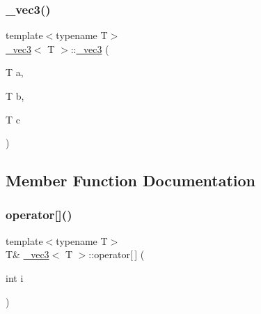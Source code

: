 \mbox{\label{class__vec3_ae790417c9b3713558524c2136951bcaa}} 
\subsubsection{\texorpdfstring{\+\_\+vec3()}{\_vec3()}\hspace{0.1cm}{\footnotesize\ttfamily [2/2]}}
{\footnotesize\ttfamily template$<$typename T$>$ \\
\hyperlink{class__vec3}{\+\_\+vec3}$<$ T $>$\+::\hyperlink{class__vec3}{\+\_\+vec3} (\begin{DoxyParamCaption}\item[{T}]{a,  }\item[{T}]{b,  }\item[{T}]{c }\end{DoxyParamCaption})\hspace{0.3cm}{\ttfamily [inline]}}



\subsection{Member Function Documentation}
\mbox{\label{class__vec3_a2740a2fc35b6431b037e933d7554abaf}} 
\subsubsection{\texorpdfstring{operator[]()}{operator[]()}\hspace{0.1cm}{\footnotesize\ttfamily [1/2]}}
{\footnotesize\ttfamily template$<$typename T$>$ \\
T\& \hyperlink{class__vec3}{\+\_\+vec3}$<$ T $>$\+::operator\mbox{[}$\,$\mbox{]} (\begin{DoxyParamCaption}\item[{int}]{i }\end{DoxyParamCaption})\hspace{0.3cm}{\ttfamily [inline]}}

\mbox{\label{class__vec3_a047b9cbc385e14f313a4f5de392923df}} 
